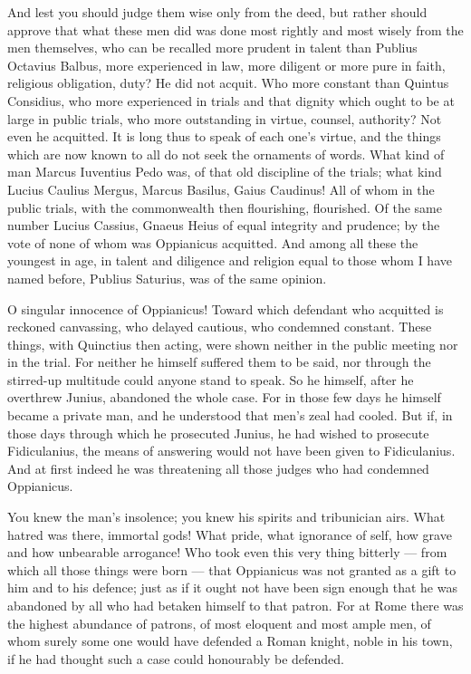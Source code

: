  And lest you should judge them wise only from the deed, but rather should approve that what these men did was done most rightly and most wisely from the men themselves, who can be recalled more prudent in talent than Publius Octavius Balbus, more experienced in law, more diligent or more pure in faith, religious obligation, duty? He did not acquit. Who more constant than Quintus Considius, who more experienced in trials and that dignity which ought to be at large in public trials, who more outstanding in virtue, counsel, authority? Not even he acquitted. It is long thus to speak of each one's virtue, and the things which are now known to all do not seek the ornaments of words. What kind of man Marcus Iuventius Pedo was, of that old discipline of the trials; what kind Lucius Caulius Mergus, Marcus Basilus, Gaius Caudinus! All of whom in the public trials, with the commonwealth then flourishing, flourished. Of the same number Lucius Cassius, Gnaeus Heius of equal integrity and prudence; by the vote of none of whom was Oppianicus acquitted. And among all these the youngest in age, in talent and diligence and religion equal to those whom I have named before, Publius Saturius, was of the same opinion.

 O singular innocence of Oppianicus! Toward which defendant who acquitted is reckoned canvassing, who delayed cautious, who condemned constant. These things, with Quinctius then acting, were shown neither in the public meeting nor in the trial. For neither he himself suffered them to be said, nor through the stirred-up multitude could anyone stand to speak. So he himself, after he overthrew Junius, abandoned the whole case. For in those few days he himself became a private man, and he understood that men's zeal had cooled. But if, in those days through which he prosecuted Junius, he had wished to prosecute Fidiculanius, the means of answering would not have been given to Fidiculanius. And at first indeed he was threatening all those judges who had condemned Oppianicus.

 You knew the man's insolence; you knew his spirits and tribunician airs. What hatred was there, immortal gods! What pride, what ignorance of self, how grave and how unbearable arrogance! Who took even this very thing bitterly --- from which all those things were born --- that Oppianicus was not granted as a gift to him and to his defence; just as if it ought not have been sign enough that he was abandoned by all who had betaken himself to that patron. For at Rome there was the highest abundance of patrons, of most eloquent and most ample men, of whom surely some one would have defended a Roman knight, noble in his town, if he had thought such a case could honourably be defended.

